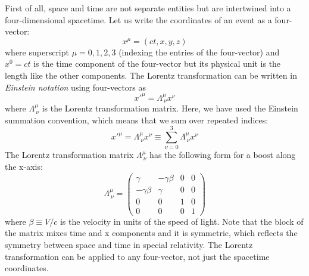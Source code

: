 \documentclass[12pt]{article}
\begin{document}
First of all, space and time are not separate entities but are intertwined into a four-dimensional spacetime. Let us write the coordinates of an event as a four-vector:
\[x^\mu = (ct, x, y, z)
\]where superscript $\mu = 0,1,2,3$ (indexing the entries of the four-vector) and $x^0 = ct$ is the time component of the four-vector but its physical unit is the length like the other components. The Lorentz transformation can be written in \textit{Einstein notation} using four-vectors as
\[
x'^\mu = \Lambda^\mu_{\ \nu} x^\nu
\]
where $\Lambda^\mu_{\ \nu}$ is the Lorentz transformation matrix. Here, we have used the Einstein summation convention, which means that we sum over repeated indices:
\[x'^\mu = \Lambda^\mu_{\ \nu} x^\nu \equiv \sum_{\nu=0}^3 \Lambda^\mu_{\ \nu} x^\nu
\]
The Lorentz transformation matrix $\Lambda^\mu_{\ \nu}$ has the following form for a boost along the x-axis:
\[\Lambda^\mu_{\ \nu} = \begin{pmatrix}
\gamma & -\gamma \beta & 0 & 0\\
-\gamma \beta & \gamma & 0 & 0\\
0 & 0 & 1 & 0\\
0 & 0 & 0 & 1
\end{pmatrix}
\]
where $\beta \equiv V/c$ is the velocity in units of the speed of light. Note that the block of the matrix mixes time and x components and it is symmetric, which reflects the symmetry between space and time in special relativity. The Lorentz transformation can be applied to any four-vector, not just the spacetime coordinates.
\end{document}
